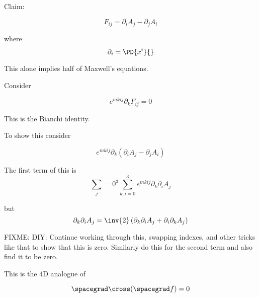 \section{}

Claim: 

\begin{equation}\label{eqn:relativisticElectrodynamicsL11:670}
F_{ij} = \partial_i A_j - \partial_j A_i
\end{equation}

where
\begin{equation}\label{eqn:relativisticElectrodynamicsL11:690}
\partial_i = \PD{x^i}{}
\end{equation}

This alone implies half of Maxwell's equations.

Consider

\begin{equation}\label{eqn:relativisticElectrodynamicsL11:710}
e^{m k i j} \partial_k F_{ij} = 0
\end{equation}

This is the Bianchi identity.

To show this consider

\begin{equation}\label{eqn:relativisticElectrodynamicsL11:730}
e^{m k i j} \partial_k (\partial_i A_j - \partial_j A_i)
\end{equation}

The first term of this is
\begin{equation}\label{eqn:relativisticElectrodynamicsL11:750}
\sum_j=0^3
\sum_{k,i=0}^3
e^{m k i j} \partial_k \partial_i A_j 
\end{equation}

but 
\begin{equation}\label{eqn:relativisticElectrodynamicsL11:770}
\partial_k \partial_i A_j 
= \inv{2} \left( \partial_k \partial_i A_j + \partial_i \partial_k A_j \right)
\end{equation}

FIXME: DIY: Continue working through this, swapping indexes, and other tricks like that to show that this is zero.  Similarly do this for the second term and also find it to be zero.

This is the 4D analogue of 

\begin{equation}\label{eqn:relativisticElectrodynamicsL11:790}
\spacegrad \cross (\spacegrad f) = 0
\end{equation}

